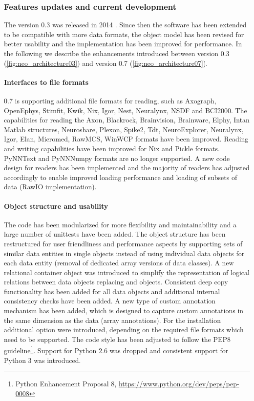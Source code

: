 \subsubsection{Features updates and current development}
The  version 0.3 was released in 2014 \citep{garcia_neo:_2014-1}. Since then the software has been extended to be compatible with more data formats, the object model has been revised for better usability and the implementation has been improved for performance. In the following we describe the enhancements introduced between version 0.3 (\cref{fig:neo_architecture03}) and version 0.7 (\cref{fig:neo_architecture07}).

\paragraph{Interfaces to file formats}
 0.7 is supporting additional file formats for reading, such as Axograph, OpenEphys, Stimfit, Kwik, Nix, Igor, Nest, Neuralynx, NSDF and BCI2000. The capabilities for reading the Axon, Blackrock, Brainvision, Brainware, Elphy, Intan Matlab structures, Neuroshare, Plexon, Spike2, Tdt, NeuroExplorer, Neuralynx, Igor, Elan, Micromed, RawMCS, WinWCP formats have been improved. Reading and writing capabilities have been improved for Nix and Pickle formats. PyNNText and PyNNNumpy formats are no longer supported. A new code design for readers has been implemented and the majority of readers has adjusted accordingly to enable improved loading performance and loading of subsets of data (RawIO implementation). 
\paragraph{Object structure and usability}
The code has been modularized for more flexibility and maintainability and a large number of unittests have been added. The object structure has been restructured for user friendliness and performance aspects by supporting sets of similar data entities in single objects instead of using individual data objects for each data entity (removal of dedicated array versions of data classes). A new relational container object  was introduced to simplify the representation of logical relations between data objects replacing  and  objects. Consistent deep copy functionality has been added for all data objects and additional internal consistency checks have been added. A new type of custom annotation mechanism has been added, which is designed to capture custom annotations in the same dimension as the data (array annotations). For the installation additional option were introduced, depending on the required file formats which need to be supported. The code style has been adjusted to follow the PEP8 guideline\footnote{Python Enhancement Proposal 8, \url{https://www.python.org/dev/peps/pep-0008}}\citep{noauthor_pep_nodate}. Support for Python 2.6 was dropped and consistent support for Python 3 was introduced.


